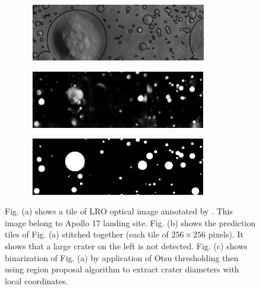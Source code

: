 \documentclass[11pt]{article}
\begin{document}
	
\begin{figure}[H]
		\begin{subfigure}{\linewidth}
			\centering
			\includegraphics[width=8cm, height=2.5cm]{files/results/dino_marking.png}
			\caption{}
		\end{subfigure}\par\medskip
		\begin{subfigure}{\linewidth}
			\centering
			\includegraphics[width=8cm, height=2.5cm]{files/results/exp.png}\hfill
			\caption{}
		\end{subfigure}\par\medskip
		\begin{subfigure}{\linewidth}
			\centering
			\includegraphics[width=8cm, height=2.5cm]{files/results/otsu_projection.png}\hfill
			\caption{}
		\end{subfigure}
		\caption{Fig. (a) shows a tile of LRO optical image annotated by \cite{dino2020}. This image belong to Apollo 17 landing site. Fig. (b) shows the prediction tiles of Fig. (a) stitched together (each tile of $256 \times 256$ pixels). It shows that a large crater on the left is not detected. Fig. (c) shows binarization of Fig. (a) by application of Otsu thresholding then using region proposal algorithm to extract crater diameters with local coordinates.}
		\label{bigcrater}
\end{figure}

%
\end{document}
